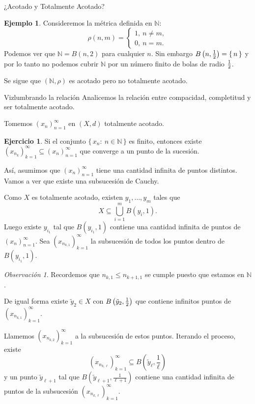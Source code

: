 \documentclass[utf8]{beamer}
\theoremstyle{plain}
\theoremstyle{definition}
\newtheorem{Ex}{Ejemplo}               %
\newtheorem{Ej}{Ejercicio}             %
\theoremstyle{remark}
\newtheorem{Rmk}[Th]{Observación}      %
\numberwithin{equation}{section}
\newcommand{\bN}{\mathbb{N}}    %
\newcommand{\set}[1]{\{\,#1\,\}}    %
\renewcommand{\l}{\ell}                   %
\renewcommand{\leq}{\leqslant}          %
\newcommand{\half}{{\mathchoice{\nhalf}{\thalf}{\shalf}{\shalf}}} %
\newcommand{\nhalf}{\frac{1}{2}}
\newcommand{\shalf}{{\scriptstyle\frac{1}{2}}} %
\newcommand{\thalf}{{\tfrac{1}{2}}} %
\newcommand{\suck}{_{k=1}^\infty} %
\newcommand{\sucn}{_{n=1}^\infty} %
\begin{document}
\begin{frame}{¿Acotado y Totalmente Acotado?}
  \begin{Ex}
    Consideremos la métrica definida en $\bN$: 
    $$\rho(n,m)=\left\lbrace\begin{aligned}
      1,\ n\neq m,\\
      0,\ n=m.
    \end{aligned}\right.$$
    Podemos ver que $\bN= B(n,2)$ para cualquier $n$. Sin embargo $B\left(n,\half\right)=\set{n}$ y por lo tanto no podemos cubrir $\bN$ por un número finito de bolas de radio $\half$.\par 
    Se sigue que $(\bN,\rho)$ es acotado pero no totalmente acotado.
  \end{Ex}
  \end{frame}

\begin{frame}{Vizlumbrando la relación}
  Analicemos la relación entre compacidad, completitud y ser totalmente acotado.\par 
  Tomemos $(x_n)\sucn$ en $(X,d)$ totalmente acotado.
  \begin{Ej}\label{ej:sucesiones}
    Si el conjunto $\set{x_n:\ n\in \bN}$ es finito, entonces existe $(x_{n_k})\suck\subseteq(x_n)\sucn$ que converge a un punto de la sucesión.
  \end{Ej}
  Así, asumimos que $(x_n)\sucn$ tiene una cantidad infinita de puntos distintos. Vamos a ver que existe una subsucesión de Cauchy.
\end{frame}

\begin{frame}
  Como $X$ es totalmente acotado, existen $y_1,\dots,y_m$ tales que 
  $$X\subseteq \bigcup_{i=1}^m B(y_i,1).$$
  Luego existe $y_{i_1}$ tal que $B(y_{i_1},1)$ contiene una cantidad infinita de puntos de $(x_n)\sucn$. Sea $(x_{n_{k,1}})\suck$ la subsucesión de todos los puntos dentro de $B(y_{i_1},1)$.
  \begin{Rmk}
    Recordemos que $n_{k,1}\leq n_{k+1,1}$ se cumple puesto que estamos en $\bN$.
  \end{Rmk}
\end{frame}

\begin{frame}
  De igual forma existe $\tilde{y}_2\in X$ con $B\left(\tilde{y}_2,\half\right)$ que contiene infinitos puntos de $(x_{n_{k,1}})\suck$.\par 
  Llamemos $(x_{n_{k,2}})\suck$ a la subsucesión de estos puntos. Iterando el proceso, existe
  $$(x_{n_{k,\l}})\suck\subseteq B\left(\tilde{y}_\l,\frac1\l\right)$$
   y un punto $\tilde{y}_{\l+1}$ tal que $B\left(\tilde{y}_{\l+1},\frac{1}{\l+1}\right)$ contiene una cantidad infinita de puntos de la subsucesión $(x_{n_{k,\l}})\suck$.
\end{frame}
\end{document}
